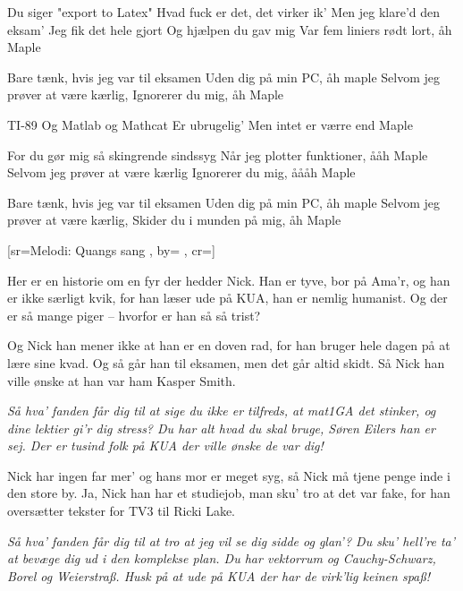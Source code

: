 \documentclass[pdftex,12pt]{article}
\begin{document}
\begin{songs}{}
\endverse
\beginverse
Du siger "export to Latex"
Hvad fuck er det, det virker ik'
Men jeg klare'd den eksam'
Jeg fik det hele gjort
Og hjælpen du gav mig
Var fem liniers rødt lort, åh Maple

\endverse
\beginverse
Bare tænk, hvis jeg var til eksamen
Uden dig på min PC, åh maple
Selvom jeg prøver at være kærlig,
Ignorerer du mig, åh Maple

\endverse
\beginverse
TI-89
Og Matlab og Mathcat
Er ubrugelig'
Men intet er værre end Maple

\endverse
\beginverse
For du gør mig så skingrende sindssyg
Når jeg plotter funktioner, ååh Maple
Selvom jeg prøver at være kærlig
Ignorerer du mig, åååh Maple

\endverse
\beginverse
Bare tænk, hvis jeg var til eksamen
Uden dig på min PC, åh maple
Selvom jeg prøver at være kærlig,
Skider du i munden på mig, åh Maple

\endverse
\endsong



﻿[sr={Melodi: Quangs sang}
,
by={}
,
cr={}]\hypertarget{Sangen om Nick}{}
\label{song68}

\beginverse
Her er en historie om en fyr der hedder Nick.
Han er tyve, bor på Ama'r, og han er ikke særligt kvik,
for han læser ude på KUA, han er nemlig humanist.
Og der er så mange piger -- hvorfor er han så så trist?
\endverse

\beginverse
Og Nick han mener ikke at han er en doven rad,
for han bruger hele dagen på at lære sine kvad.
Og så går han til eksamen, men det går altid skidt.
Så Nick han ville ønske at han var ham Kasper Smith.
\endverse

\beginverse
\emph{Så hva' fanden får dig til at sige du ikke er tilfreds,
at mat1GA det stinker, og dine lektier gi'r dig stress?
Du har alt hvad du skal bruge, Søren Eilers han er sej.
Der er tusind folk på KUA der ville ønske de var dig!}
\endverse

\beginverse
Nick har ingen far mer' og hans mor er meget syg,
så Nick må tjene penge inde i den store by.
Ja, Nick han har et studiejob, man sku' tro at det var fake,
for han oversætter tekster for TV3 til Ricki Lake.
\endverse

\beginverse
\emph{Så hva' fanden får dig til at tro at jeg vil se dig sidde og glan'?
Du sku' hell're ta' at bevæge dig ud i den komplekse plan.
Du har vektorrum og Cauchy-Schwarz, Borel og Weierstra\ss.
Husk på at ude på KUA der har de virk'lig keinen spa\ss!}
\endverse


\end{songs}
\end{document}
